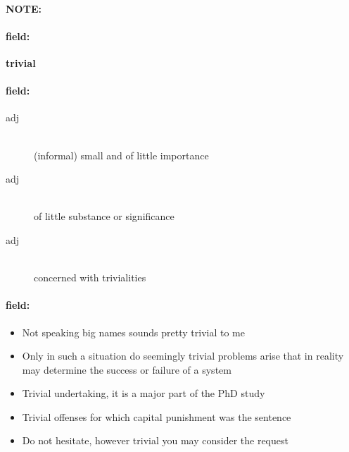 \documentclass[12pt]{article}
\newenvironment{note}{\paragraph{NOTE:}}{}
\newenvironment{field}{\paragraph{field:}}{}
\begin{document}
\begin{note}
\begin{field}
\textbf{\large trivial}
\end{field}


\begin{field}
\begin{description}
\item[adj] \hfill \\ 
(informal) small and of little importance

\item[adj] \hfill \\ 
of little substance or significance

\item[adj] \hfill \\ 
concerned with trivialities

\end{description}
\end{field}

\begin{field}
\begin{itemize}
\item Not speaking big names sounds pretty trivial to me
\item Only in such a situation do seemingly trivial problems arise that in reality may determine the success or failure of a system
\item Trivial undertaking, it is a major part of the PhD study
\item Trivial offenses for which capital punishment was the sentence
\item Do not hesitate, however trivial you may consider the request
\end{itemize}
\end{field}
\end{note}
\end{document}
